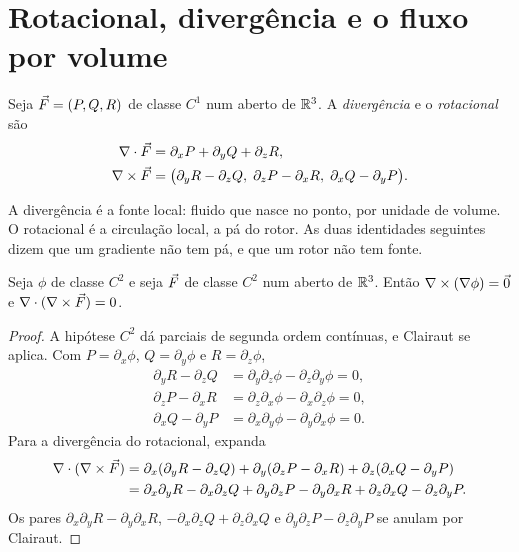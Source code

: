 \documentclass[11pt,a4paper]{article}
\begin{document}
\section{Rotacional, divergência e o fluxo por volume}

\begin{definicao}
Seja $\vec{F}=(P,Q,R)$ de classe $C^1$ num aberto de $\mathbb{R}^3$. A \emph{divergência} e o \emph{rotacional} são
\begin{align*}
\nabla\cdot\vec{F}
&=\partial_x P+\partial_y Q+\partial_z R,\\
\nabla\times\vec{F}
&=\bigl(
\partial_y R-\partial_z Q,\;
\partial_z P-\partial_x R,\;
\partial_x Q-\partial_y P
\bigr).
\end{align*}
\end{definicao}

A divergência é a fonte local: fluido que nasce no ponto, por unidade de volume. O rotacional é a circulação local, a pá do rotor. As duas identidades seguintes dizem que um gradiente não tem pá, e que um rotor não tem fonte.

\begin{proposicao}
\label{prop:identidades}
Seja $\phi$ de classe $C^2$ e seja $\vec{F}$ de classe $C^2$ num aberto de $\mathbb{R}^3$. Então $\nabla\times(\nabla\phi)=\vec{0}$ e $\nabla\cdot(\nabla\times\vec{F})=0$.
\end{proposicao}

\begin{proof}
A hipótese $C^2$ dá parciais de segunda ordem contínuas, e Clairaut se aplica. Com $P=\partial_x\phi$, $Q=\partial_y\phi$ e $R=\partial_z\phi$,
\begin{align*}
\partial_y R-\partial_z Q&=\partial_y\partial_z\phi-\partial_z\partial_y\phi=0,\\
\partial_z P-\partial_x R&=\partial_z\partial_x\phi-\partial_x\partial_z\phi=0,\\
\partial_x Q-\partial_y P&=\partial_x\partial_y\phi-\partial_y\partial_x\phi=0.
\end{align*}
Para a divergência do rotacional, expanda
\begin{align*}
\nabla\cdot(\nabla\times\vec{F})
&=\partial_x(\partial_y R-\partial_z Q)
+\partial_y(\partial_z P-\partial_x R)
+\partial_z(\partial_x Q-\partial_y P)\\
&=\partial_x\partial_y R-\partial_x\partial_z Q
+\partial_y\partial_z P-\partial_y\partial_x R
+\partial_z\partial_x Q-\partial_z\partial_y P.
\end{align*}
Os pares $\partial_x\partial_y R-\partial_y\partial_x R$, $-\partial_x\partial_z Q+\partial_z\partial_x Q$ e $\partial_y\partial_z P-\partial_z\partial_y P$ se anulam por Clairaut.
\end{proof}
\end{document}
